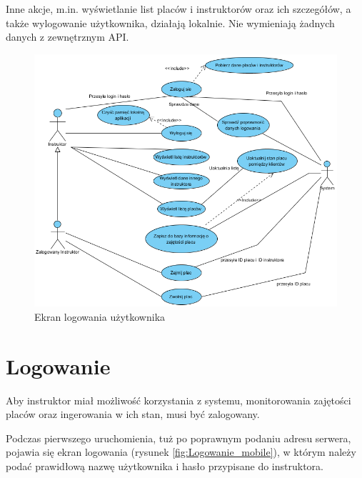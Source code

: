 \documentclass[twoside,a4paper,openright,12pt]{book}
\begin{document}
Inne akcje, m.in. wyświetlanie list placów i instruktorów oraz ich szczegółów, a także wylogowanie użytkownika, działają lokalnie. Nie wymieniają żadnych danych z zewnętrznym API.

\begin{figure}[H]
\centering
\includegraphics[width=1\textwidth]{screenshots/uml/usecases.png}
\caption{Ekran logowania użytkownika}
\label{fig:Diagram przypadków użycia}
\end{figure}



\section{Logowanie}
Aby instruktor miał możliwość korzystania z systemu, monitorowania zajętości placów oraz ingerowania w ich stan, musi być zalogowany.

Podczas pierwszego uruchomienia, tuż po poprawnym podaniu adresu serwera, pojawia się ekran logowania (rysunek \ref{fig:Logowanie_mobile}), w którym należy podać prawidłową nazwę użytkownika i hasło przypisane do instruktora.
\end{document}

